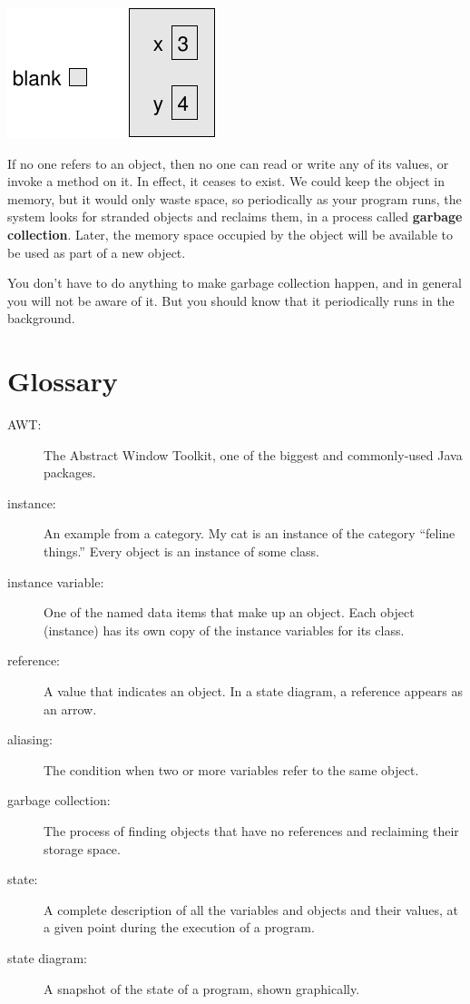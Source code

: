 \includegraphics{figs/reference3.pdf}


If no one refers to an object, then no one can read or write any of
its values, or invoke a method on it.  In effect, it ceases to exist.
We could keep the object in memory, but it would only waste space, so
periodically as your program runs, the system looks for stranded
objects and reclaims them, in a process called {\bf garbage
collection}.  Later, the memory space occupied by the object will
be available to be used as part of a new object.

You don't have to do anything to make garbage collection happen,
and in general you will not be aware of it.  But you
should know that it periodically runs in the background.


\section{Glossary}

\begin{description}

\item[AWT:]  The Abstract Window Toolkit, one of the biggest
and commonly-used Java packages.

\item[instance:]  An example from a category.  My cat is an
instance of the category ``feline things.''  Every object is
an instance of some class.

\item[instance variable:]  One of the named data items that make
up an object.  Each object (instance) has its own copy of
the instance variables for its class.

\item[reference:]  A value that indicates an object.  In a
state diagram, a reference appears as an arrow.

\item[aliasing:] The condition when two or more variables refer
to the same object.

\item[garbage collection:]  The process of finding objects that
have no references and reclaiming their storage space.

\item[state:] A complete description of all the variables and
objects and their values, at a given point during the execution
of a program.

\item[state diagram:] A snapshot of the state of a program, shown
graphically.


\end{description}


